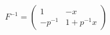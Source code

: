 \begin{equation}
F^{-1}= \left(
\begin{array}{cc}
1 & -x \\
-p^{-1} & 1+p^{-1} x
\end{array}
\right)
\end{equation}

